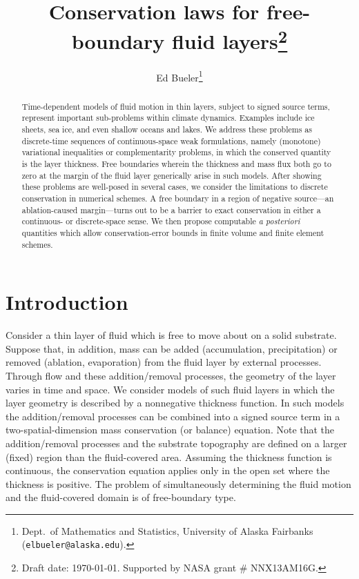 \documentclass[final,onefignum]{siamart190516}
\title{Conservation laws for free-boundary fluid layers\thanks{Draft date: \today.  Supported by NASA grant \# NNX13AM16G.}}
\author{Ed Bueler\thanks{Dept.~of Mathematics and Statistics, University of Alaska Fairbanks \,\, (\texttt{elbueler@alaska.edu}).}}
\begin{document}
\maketitle

\begin{abstract}
Time-dependent models of fluid motion in thin layers, subject to signed source terms, represent important sub-problems within climate dynamics.  Examples include ice sheets, sea ice, and even shallow oceans and lakes.  We address these problems as discrete-time sequences of continuous-space weak formulations, namely (monotone) variational inequalities or complementarity problems, in which the conserved quantity is the layer thickness.  Free boundaries wherein the thickness and mass flux both go to zero at the margin of the fluid layer generically arise in such models.  After showing these problems are well-posed in several cases, we consider the limitations to discrete conservation in numerical schemes.  A free boundary in a region of negative source---an ablation-caused margin---turns out to be a barrier to exact conservation in either a continuous- or discrete-space sense.  We then propose computable \emph{a posteriori} quantities which allow conservation-error bounds in finite volume and finite element schemes.
\end{abstract}


\pagestyle{myheadings}
\thispagestyle{plain}


\section{Introduction}  \label{sec:intro}

Consider a thin layer of fluid which is free to move about on a solid substrate.  Suppose that, in addition, mass can be added (accumulation, precipitation) or removed (ablation, evaporation) from the fluid layer by external processes.  Through flow and these addition/removal processes, the geometry of the layer varies in time and space.  We consider models of such fluid layers in which the layer geometry is described by a nonnegative thickness function.  In such models the addition/removal processes can be combined into a signed source term in a two-spatial-dimension mass conservation (or balance) equation.  Note that the addition/removal processes and the substrate topography are defined on a larger (fixed) region than the fluid-covered area.  Assuming the thickness function is continuous, the conservation equation applies only in the open set where the thickness is positive.  The problem of simultaneously determining the fluid motion and the fluid-covered domain is of free-boundary type.
\end{document}
